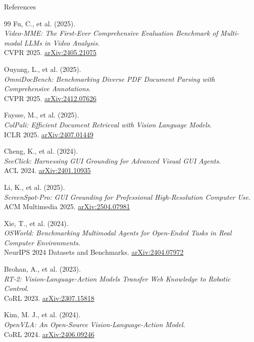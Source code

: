\begin{frame}[allowframebreaks]{References}
\begin{thebibliography}{99}
      Fu, C., et al. (2025). \\
      \emph{Video-MME: The First-Ever Comprehensive Evaluation Benchmark of Multi-modal LLMs in Video Analysis}.\\
      CVPR 2025. \href{https://arxiv.org/abs/2405.21075}{arXiv:2405.21075}

      Ouyang, L., et al. (2025). \\
      \emph{OmniDocBench: Benchmarking Diverse PDF Document Parsing with Comprehensive Annotations}.\\
      CVPR 2025. \href{https://arxiv.org/abs/2412.07626}{arXiv:2412.07626}

      Faysse, M., et al. (2025). \\
      \emph{ColPali: Efficient Document Retrieval with Vision Language Models}.\\
      ICLR 2025. \href{https://arxiv.org/abs/2407.01449}{arXiv:2407.01449}

      Cheng, K., et al. (2024). \\
      \emph{SeeClick: Harnessing GUI Grounding for Advanced Visual GUI Agents}.\\
      ACL 2024. \href{https://arxiv.org/abs/2401.10935}{arXiv:2401.10935}

      Li, K., et al. (2025). \\
      \emph{ScreenSpot-Pro: GUI Grounding for Professional High-Resolution Computer Use}.\\
      ACM Multimedia 2025. \href{https://arxiv.org/abs/2504.07981}{arXiv:2504.07981}

      Xie, T., et al. (2024). \\
      \emph{OSWorld: Benchmarking Multimodal Agents for Open-Ended Tasks in Real Computer Environments}.\\
      NeurIPS 2024 Datasets and Benchmarks. \href{https://arxiv.org/abs/2404.07972}{arXiv:2404.07972}

      Brohan, A., et al. (2023). \\
      \emph{RT-2: Vision-Language-Action Models Transfer Web Knowledge to Robotic Control}.\\
      CoRL 2023. \href{https://arxiv.org/abs/2307.15818}{arXiv:2307.15818}

      Kim, M. J., et al. (2024). \\
      \emph{OpenVLA: An Open-Source Vision-Language-Action Model}.\\
      CoRL 2024. \href{https://arxiv.org/abs/2406.09246}{arXiv:2406.09246}


\end{thebibliography}
\end{frame}
